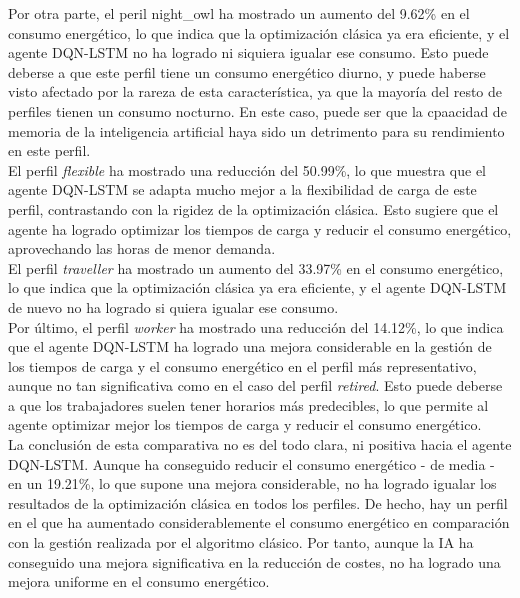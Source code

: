Por otra parte, el peril night\_owl ha mostrado un aumento del 9.62\% en el consumo energético,
lo que indica que la optimización clásica ya era eficiente, y el agente DQN-LSTM no ha logrado
ni siquiera igualar ese consumo. Esto puede deberse a que este perfil tiene un consumo energético
diurno, y puede haberse visto afectado por la rareza de esta característica, ya que la mayoría del 
resto de perfiles tienen un consumo nocturno. En este caso, puede ser que la cpaacidad de memoria
de la inteligencia artificial haya sido un detrimento para su rendimiento en este perfil.\\

El perfil \textit{flexible} ha mostrado una reducción del 50.99\%, lo que muestra que el agente 
DQN-LSTM se adapta mucho mejor a la flexibilidad de carga de este perfil, contrastando con la 
rigidez de la optimización clásica. Esto sugiere que el agente ha logrado optimizar los tiempos de
carga y reducir el consumo energético, aprovechando las horas de menor demanda.\\

El perfil \textit{traveller} ha mostrado un aumento del 33.97\% en el consumo energético, lo que
indica que la optimización clásica ya era eficiente, y el agente DQN-LSTM de nuevo no ha logrado
si quiera igualar ese consumo.\\

Por último, el perfil \textit{worker} ha mostrado una reducción del 14.12\%, lo que indica que
el agente DQN-LSTM ha logrado una mejora considerable en la gestión de los tiempos de carga y el
consumo energético en el perfil más representativo, aunque no tan significativa como en el caso 
del perfil \textit{retired}. Esto puede deberse a que los trabajadores suelen tener horarios más
predecibles, lo que permite al agente optimizar mejor los tiempos de carga y reducir el consumo
energético.\\

La conclusión de esta comparativa no es del todo clara, ni positiva hacia el agente DQN-LSTM.
Aunque ha conseguido reducir el consumo energético - de media - en un 19.21\%, lo que supone una 
mejora considerable, no ha logrado igualar los resultados de la optimización clásica en todos los
perfiles. De hecho, hay un perfil en el que ha aumentado considerablemente el consumo energético 
en comparación con la gestión realizada por el algoritmo clásico. Por tanto, aunque la IA ha
conseguido una mejora significativa en la reducción de costes, no ha logrado una mejora uniforme en
el consumo energético.

